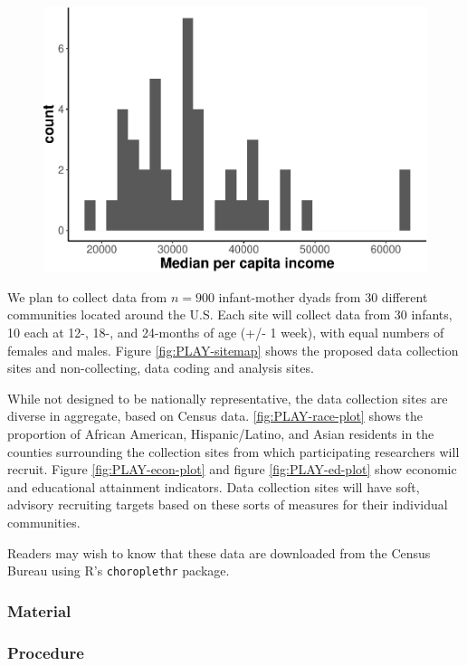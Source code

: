 \documentclass[english,man]{apa6}
\theoremstyle{definition}
\theoremstyle{definition}
\theoremstyle{definition}
\theoremstyle{remark}
\begin{document}
\begin{figure}
\centering
\includegraphics{ibad-ms_files/figure-latex/PLAY-econ-plot-1.pdf}
\caption{}
\end{figure}

We plan to collect data from \(n=900\) infant-mother dyads from 30
different communities located around the U.S. Each site will collect
data from 30 infants, 10 each at 12-, 18-, and 24-months of age (+/- 1
week), with equal numbers of females and males. Figure
\ref{fig:PLAY-sitemap} shows the proposed data collection sites and
non-collecting, data coding and analysis sites.

While not designed to be nationally representative, the data collection
sites are diverse in aggregate, based on Census data.
\ref{fig:PLAY-race-plot} shows the proportion of African American,
Hispanic/Latino, and Asian residents in the counties surrounding the
collection sites from which participating researchers will recruit.
Figure \ref{fig:PLAY-econ-plot} and figure \ref{fig:PLAY-ed-plot} show
economic and educational attainment indicators. Data collection sites
will have soft, advisory recruiting targets based on these sorts of
measures for their individual communities.

Readers may wish to know that these data are downloaded from the Census
Bureau using R's \texttt{choroplethr} \cite{choropletr} package.

\subsubsection{Material}\label{material-1}

\subsubsection{Procedure}\label{procedure-1}
\end{document}
